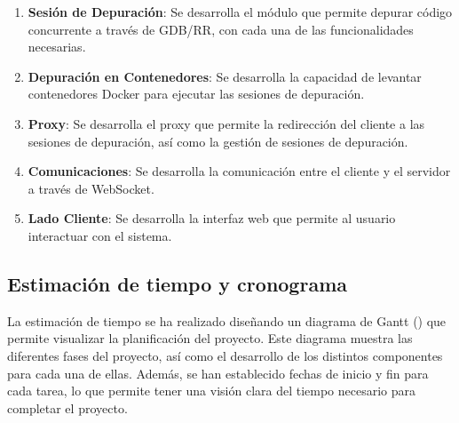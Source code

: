 \begin{enumerate}
    \item \textbf{Sesión de Depuración}: Se desarrolla el módulo que permite depurar código concurrente a través de GDB/RR, con cada una de las funcionalidades necesarias. 
    \item \textbf{Depuración en Contenedores}: Se desarrolla la capacidad de levantar contenedores Docker para ejecutar las sesiones de depuración.
    \item \textbf{Proxy}: Se desarrolla el proxy que permite la redirección del cliente a las sesiones de depuración, así como la gestión de sesiones de depuración.
    \item \textbf{Comunicaciones}: Se desarrolla la comunicación entre el cliente y el servidor a través de WebSocket.
    \item \textbf{Lado Cliente}: Se desarrolla la interfaz web que permite al usuario interactuar con el sistema.
\end{enumerate} 

\subsection{Estimación de tiempo y cronograma}\label{sec:cronograma}

La estimación de tiempo se ha realizado diseñando un diagrama de Gantt () que permite visualizar la planificación del proyecto. Este diagrama muestra las diferentes fases del proyecto, así como el desarrollo de los distintos componentes para cada una de ellas. Además, se han establecido fechas de inicio y fin para cada tarea, lo que permite tener una visión clara del tiempo necesario para completar el proyecto.

